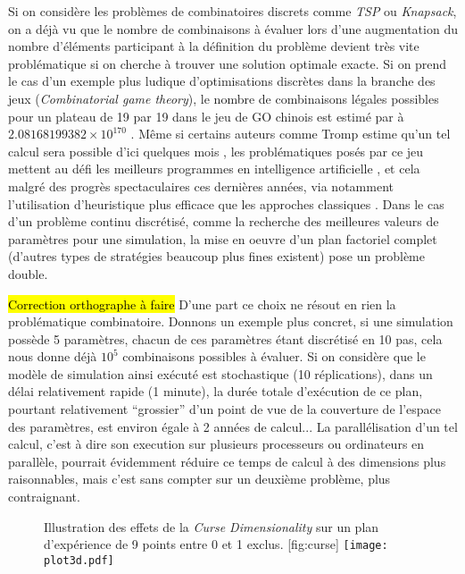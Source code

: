 Si on considère les problèmes de combinatoires discrets comme \textit{TSP} ou \textit{Knapsack}, on a déjà vu que le nombre de combinaisons à évaluer lors d'une augmentation du nombre d'éléments participant à la définition du problème devient très vite problématique si on cherche à trouver une solution optimale exacte. Si on prend le cas d'un exemple plus ludique d'optimisations discrètes dans la branche des jeux (\textit{Combinatorial game theory}), le nombre de combinaisons légales possibles pour un plateau de 19 par 19 dans le jeu de GO chinois est estimé par \textcite{Tromp2007} à $2.08168199382×10^{170}$ . Même si certains auteurs comme Tromp estime qu'un tel calcul sera possible d'ici quelques mois , les problématiques posés par ce jeu mettent au défi les meilleurs programmes en intelligence artificielle \autocite{Bouzi2001}, et cela malgré des progrès spectaculaires ces dernières années, via notamment l'utilisation d'heuristique plus efficace que les approches classiques .  Dans le cas d'un problème continu discrétisé, comme la recherche des meilleures valeurs de paramètres pour une simulation, la mise en oeuvre d'un plan factoriel complet (d'autres types de stratégies beaucoup plus fines existent) pose un problème double.

\hl{Correction orthographe à faire}
D'une part ce choix ne résout en rien la problématique combinatoire. Donnons un exemple plus concret, si une simulation possède 5 paramètres, chacun de ces paramètres étant discrétisé en 10 pas, cela nous donne déjà $10^5$ combinaisons possibles à évaluer. Si on considère que le modèle de simulation ainsi exécuté est stochastique (10 réplications), dans un délai relativement rapide (1 minute), la durée totale d'exécution de ce plan, pourtant relativement \enquote{grossier} d'un point de vue de la couverture de l'espace des paramètres, est environ égale à 2 années de calcul... La parallélisation d'un tel calcul, c'est à dire son execution sur plusieurs processeurs ou ordinateurs en parallèle, pourrait évidemment réduire ce temps de calcul à des dimensions plus raisonnables, mais c'est sans compter sur un deuxième problème, plus contraignant.

\begin{figure}[htbp]
	\begin{sidecaption}[fortoc]{Illustration des effets de la \textit{Curse Dimensionality} sur un plan d'expérience de 9 points entre 0 et 1 exclus. }[fig:curse]
	 \centering
	 	\texttt{[image: plot3d.pdf]}
	\end{sidecaption}
\end{figure}


